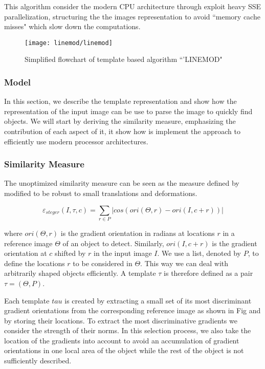 This algorithm consider the modern CPU architecture through exploit heavy SSE parallelization, 
structuring the the images 
representation to  avoid ``memory cache misses" which slow down the computations.

\begin{figure}[ht]
\centering
\texttt{[image: linemod/linemod]}
\caption{Simplified flowchart of template based algorithm ``'LINEMOD" \citet{Hinterstoisser2011}}
\label{fig:clutter}
\end{figure}

\subsubsection{Model}
In this section, we describe the template representation and show how the representation 
of the input image can be use to parse the image to quickly find objects.
We will start by deriving the similarity measure, emphasizing the contribution of each 
aspect of it,  it show how is implement the approach to
efficiently use modern processor architectures.

\subsubsection{Similarity Measure}
The unoptimized similarity measure can be seen as the measure defined by \citet{Steger2002} 
modified to be robust to small translations and deformations. 

\begin{equation}
\label{eq:similarity}
\varepsilon_{steger}(I, \tau, c) = \sum_{r \in P}\left| cos(ori(\Theta,r) - ori(I,c+r))\right|
\end{equation}

where $ori(\Theta,r)$ is the gradient orientation in radians at locations $r$ in a 
reference image $\Theta$ of an object to detect. Similarly, $ori(I,c+r)$ is the 
gradient orientation at $c$ shifted by $r$ in the input image $I$. We use a list,
denoted by $P$, to define the locations $r$ to be considered in $\Theta$. This way we
can deal with arbitrarily shaped objects efficiently. A template $\tau$ is therefore
defined as a pair $\tau=(\Theta,P)$.

Each template $tau$ is created by extracting a small set of its most discriminant
gradient orientations from the corresponding reference image as shown in Fig
and by storing their locations. To extract the most discriminative gradients we consider
the strength of their norms. In this selection process, we also take the location
of the gradients into account to avoid an accumulation of gradient orientations in
one local area of the object while the rest of the object is not sufficiently described.

